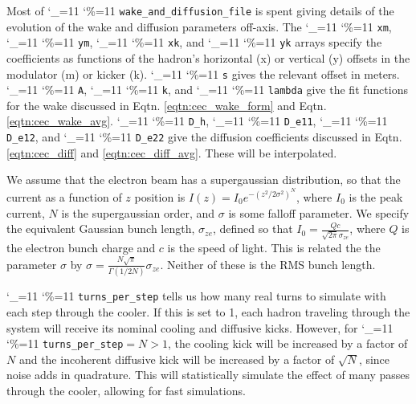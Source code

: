 \documentclass[letterpaper,11pt]{article}
\newcommand{\vn}{\begingroup\catcode`\_=11 \catcode`\%=11 \dottcmd}
\newcommand\dottcmd[1]{\texttt{#1}\endgroup}
\begin{document}
Most of \vn{wake_and_diffusion_file} is spent giving details of the evolution of the wake and diffusion parameters off-axis. The \vn{xm}, \vn{ym}, \vn{xk}, and \vn{yk} arrays specify the coefficients as functions of the hadron's horizontal (x) or vertical (y) offsets in the modulator (m) or kicker (k). \vn{s} gives the relevant offset in meters. \vn{A}, \vn{k}, and \vn{lambda} give the fit functions for the wake discussed in Eqtn. \ref{eqtn:cec_wake_form} and Eqtn. \ref{eqtn:cec_wake_avg}. \vn{D_h}, \vn{D_e11}, \vn{D_e12}, and \vn{D_e22} give the diffusion coefficients discussed in Eqtn. \ref{eqtn:cec_diff} and \ref{eqtn:cec_diff_avg}. These will be interpolated.

We assume that the electron beam has a supergaussian distribution, so that the current as a function of $z$ position is $I(z) = I_0 e^{-(z^2/2\sigma^2)^N}$, where $I_0$ is the peak current, $N$ is the supergaussian order, and $\sigma$ is some falloff parameter. We specify the equivalent Gaussian bunch length, $\sigma_{ze}$, defined so that $I_0 = \frac{Qc}{\sqrt{2\pi}\sigma_{ze}}$, where $Q$ is the electron bunch charge and $c$ is the speed of light. This is related the the parameter $\sigma$ by $\sigma = \frac{N\sqrt{\pi}}{\Gamma(1/2N)}\sigma_{ze}$. Neither of these is the RMS bunch length.

\vn{turns_per_step} tells us how many real turns to simulate with each step through the cooler. If this is set to 1, each hadron traveling through the system will receive its nominal cooling and diffusive kicks. However, for \vn{turns_per_step}$ = N > 1$, the cooling kick will be increased by a factor of $N$ and the incoherent diffusive kick will be increased by a factor of $\sqrt{N}$, since noise adds in quadrature. This will statistically simulate the effect of many passes through the cooler, allowing for fast simulations.
\end{document}
